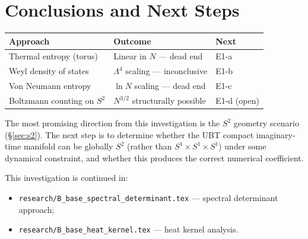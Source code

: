\documentclass[11pt,a4paper]{article}
\begin{document}
\section{Conclusions and Next Steps}
\label{sec:conclusions}

\begin{center}
\begin{tabular}{lll}
\hline
Approach & Outcome & Next \\
\hline
Thermal entropy (torus) & Linear in $N$ — dead end & E1-a \\
Weyl density of states & $\Lambda^4$ scaling — inconclusive & E1-b \\
Von Neumann entropy & $\ln N$ scaling — dead end & E1-c \\
Boltzmann counting on $S^2$ & $N^{3/2}$ structurally possible & E1-d (open) \\
\hline
\end{tabular}
\end{center}

The most promising direction from this investigation is the $S^2$ geometry
scenario (§\ref{sec:s2}).  The next step is to determine whether the UBT
compact imaginary-time manifold can be globally $S^2$ (rather than
$S^1 \times S^1 \times S^1$) under some dynamical constraint, and whether
this produces the correct numerical coefficient.

This investigation is continued in:
\begin{itemize}
  \item \texttt{research/B\_base\_spectral\_determinant.tex} — spectral
    determinant approach;
  \item \texttt{research/B\_base\_heat\_kernel.tex} — heat kernel analysis.
\end{itemize}
\end{document}
